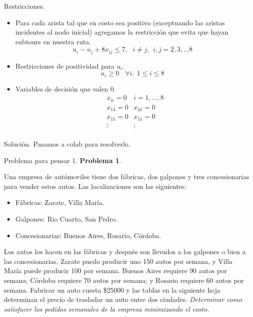 \documentclass{beamer}
\begin{document}
\begin{frame}[fragile]{Restricciones.}
  \begin{itemize}
    \item Para cada arista tal que su costo sea positivo (exceptuando las aristas incidentes al nodo inicial) agregamos la restricción que evita que hayan subtours en nuestra ruta.
    \pause 
      \[
        u_{i} - u_{j} + 8x_{ij} \le 7, \ \ \ i \neq j, \ \  i,j = 2,3, \dots 8
      \]

    \pause 
    \item Restricciones de positividad para $u_{i}$.
      \[
        u_{i} \ge 0 \ \ \ \ \forall i. \ \ 1 \le i \le 8
      \]
    
    \item Variables de decisión que valen $0$.
      \begin{align*}
        &x_{ii} = 0  & i = 1, \dots, 8 \\
        &x_{14} = 0  & x_{41} = 0      \\
        &x_{15} = 0  & x_{51} = 0      \\
        &\vdots  & \vdots     \\
      \end{align*}
  \end{itemize}
\end{frame}

\begin{frame}[fragile]{Solución.}
  Pasamos a colab para resolverlo.
\end{frame}

\begin{frame}[fragile]{Problema para pensar 1.}
  \textbf{Problema 1}.

  Una empresa de autómoviles tiene dos fábricas, dos galpones y tres concesionarias para vender estos autos.
  Las localizaciones son las siguientes:
  \begin{itemize}
    \item Fábricas: Zarate, Villa María.
    \item Galpones: Rio Cuarto, San Pedro.
    \item Concesionarias: Buenos Aires, Rosario, Córdoba.
  \end{itemize}
  Los autos los hacen en las fábricas y después son llevados a los galpones o bien a las concesionarias. 
  Zarate puedo producir uno 150 autos por semana, y Villa María puede producir 100 por semana.
  Buenos Aires requiere 90 autos por semana; Córdoba requiere 70 autos por semana; y Rosario requiere 60 autos por semana.
  Fabricar un auto cuesta \$25000 y las tablas en la siguiente hoja determinan el precio de trasladar un auto entre dos ciudades. 
  \emph{Determinar como satisfacer los pedidos semanales de la empresa minimizando el costo.}
\end{frame}
\end{document}

